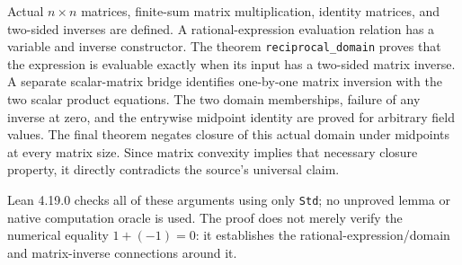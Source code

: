 \documentclass[11pt]{article}
\begin{document}
Actual $n\times n$ matrices, finite-sum matrix multiplication, identity
matrices, and two-sided inverses are defined. A rational-expression
evaluation relation has a variable and inverse constructor. The theorem
\texttt{reciprocal\_domain} proves that the expression is evaluable exactly
when its input has a two-sided matrix inverse. A separate scalar-matrix
bridge identifies one-by-one matrix inversion with the two scalar product
equations. The two domain memberships, failure of any inverse at zero,
and the entrywise midpoint identity are proved for arbitrary field values.
The final theorem negates closure of this actual domain under midpoints
at every matrix size. Since matrix convexity implies that necessary
closure property, it directly contradicts the source's universal claim.

Lean 4.19.0 checks all of these arguments using only \texttt{Std}; no
unproved lemma or native computation oracle is used. The proof does not
merely verify the numerical equality $1+(-1)=0$: it establishes the
rational-expression/domain and matrix-inverse connections around it.
\end{document}
